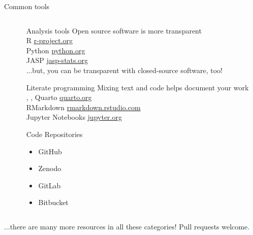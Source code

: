 \begin{block}{Common tools}
\begin{columns}[t]
\begin{column}{.45\linewidth}
  \end{column}\hfill
   \begin{column}{.45\linewidth}

\begin{subblock}{ \hfill Analysis tools\hfill {}}
Open source software is more transparent \\ \vspace{0.5em}
  R \href{https://www.r-project.org/}{r-project.org}
\\  Python \href{https://www.python.org/}{python.org}
\\ JASP \href{https://jasp-stats.org/}{jasp-stats.org} \\ \vspace{0.5em}
...but, you can be transparent with closed-source software, too!
  \end{subblock}
   
\begin{subblock}{\hfill Literate programming\hfill {}}
Mixing text and code helps document your work \\ \vspace{0.5em} , ,   Quarto \href{https://quarto.org/}{quarto.org}
\\  RMarkdown \href{https://rmarkdown.rstudio.com/}{rmarkdown.rstudio.com}
\\  Jupyter Notebooks \href{https://jupyter.org/
}{jupyter.org}
  \end{subblock}

  \begin{subblock}{\hfill Code Repositories\hfill {}}
\begin{itemize}
    \item GitHub 
    \item Zenodo
    \item GitLab 
    \item Bitbucket 

\end{itemize}
  \end{subblock}
  \end{column}\hfill\hfill\hfill

  \end{columns}
   ...there are many more resources in all these categories! Pull requests welcome.   
   

\end{block}